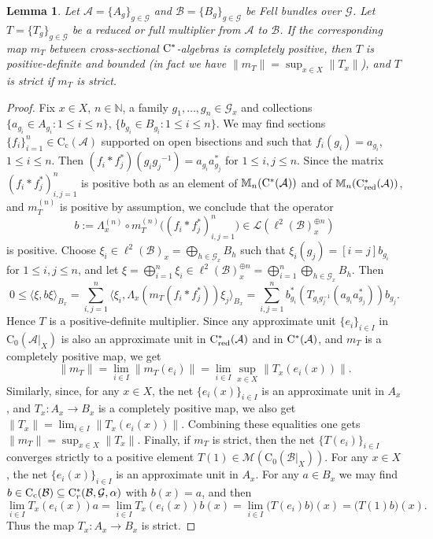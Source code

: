\documentclass[11 pt, leqno]{amsart}
\numberwithin{equation}{section}
\theoremstyle{plain}
\newtheorem {lem} [thm]{Lemma}
\theoremstyle{definition}
\newcommand{\Mat}{\mathbb M} %
\newcommand*{\contc}{\mathrm{C_c}}%
\newcommand*{\contz}{\mathrm{C_0}}%
\renewcommand{\star}{*}
\DeclareMathOperator{\red}{red}%
\newcommand{\B}{\mathcal B}
\newcommand{\M}{\mathcal M}
\newcommand{\m}{m}
\newcommand{\G}{\mathcal G} %
\renewcommand{\L}{\mathcal L}
\newcommand{\A}{\mathcal A}
\newcommand{\N}{\mathbb N}
\newcommand{\cst}{\ifmmode\mathrm{C}^*\else{$\mathrm{C}^*$}\fi}
\begin{document}
\begin{lem}\label{lem:completely_positive_implies_positive_definite}
Let $\A = \{ A_g \}_{g \in \G}$ and $\B = \{ B_g \}_{g \in \G}$ be Fell bundles over $\G$. 
Let $T = \{ T_g \}_{g\in \G}$ be a reduced or full multiplier from $\A$ to $\B$. 
If the corresponding map $\m_T$ between cross-sectional $\cst$-algebras is completely positive, then $T$ is positive-definite and bounded (in fact we have $\|\m_T\|=\sup_{x\in X}\|T_x\|$), and $T$ is strict if $\m_T$ is strict.
\end{lem}
\begin{proof}
Fix $x \in X$, $n \in \N$, a family $g_1 , \ldots , g_n \in \G_x$ and collections $\{ a_{g_i} \in A_{g_i} : 1 \leq i \leq n \}$, $\{ b_{g_i} \in B_{g_i} : 1 \leq i \leq n \}$. 
We may find sections $\{ f_i \}_{i = 1}^n \in \contc(\A)$ supported on open bisections and such that $f_{i}(g_i) = a_{g_i}$, $1 \leq i \leq n$. 
Then $(f_i * f_j^*)(g_i {g_j}^{-1}) = a_{g_i} a_{g_j}^{\star}$ for $1 \leq i,j \leq n$. 
Since the matrix $(f_i * f_j^*)_{i,j = 1}^n$ is positive both as an element of $\Mat_{n}(\cst(\A))$ and of $\Mat_{n}(\cst_{\red}(\A))$, and $\m_T^{(n)}$ is positive by assumption, we conclude that the operator 
\[ 
    b := \Lambda_x^{(n)} \circ \m_T^{(n)}  \big( (f_i * f_j^*)_{i , j = 1}^n \big) \in \L(\ell^2(\B)_{x}^{\oplus n})  
\]
is positive. 
Choose $\xi_i \in \ell^2(\B)_{x} = \bigoplus_{h \in \G_x} B_{h}$ such that $\xi_i(g_j) = [i = j] b_{g_i}$ for $1 \leq i,j \leq n$, and let $\xi = \bigoplus_{i = 1}^n \xi_{i} \in \ell^2(\B)_{x}^{\oplus n} =\bigoplus_{i = 1}^n \bigoplus_{h \in \G_x} B_{h}$. 
Then 
\[
    0 \leq \langle \xi, b \xi \rangle_{B_x} = \sum_{i , j = 1}^n \langle \xi_i , \Lambda_x(\m_T (f_i * f_j^*)) \xi_j \rangle_{B_x} = \sum_{i,j = 1}^n b_{g_i}^{\star} \left( T_{g_i g_j^{-1}} (a_{g_i} a_{g_j}^{\star}) \right) b_{g_j} .
\]
Hence $T$ is a positive-definite multiplier. 
Since any approximate unit $\{e_i\}_{i\in I}$ in $\contz(\A|_X)$ is also an approximate unit in $\cst_{\red}(\A)$ and in $\cst(\A)$, and $\m_T$ is a completely positive map, we get  
\[
    \| \m_T \| = \lim_{i\in I} \| \m_T(e_i) \| = \lim_{i\in I} \sup_{x\in X} \| T_x(e_i(x)) \| .
\]
Similarly, since, for any $x\in X$, the net $\{e_i(x)\}_{i \in I}$ is an approximate unit in $A_x$, and $T_x : A_x \to B_x$ is a completely positive  map, we also get $\| T_{x} \| = \lim_{i\in I} \| T_x (e_i(x)) \|$. 
Combining these equalities one gets $\|\m_T\|=\sup_{x\in X}\|T_x\|$.
Finally, if  $\m_T$ is strict, then the net $\{T(e_i)\}_{i \in I}$ converges strictly to a positive element $T(1)\in \M(\contz(\B|_X))$. 
For any $x\in X$, the net $\{e_i(x)\}_{i\in I}$ is an approximate unit in $A_x$.
For any $a\in B_x$ we may find $b \in \contc(\B)\subseteq \cst_r(\B,\G,\alpha)$ with $b(x) = a$, and then
\[
    \lim_{i\in I} T_x(e_i(x))a = \lim_{i\in I} T_x(e_i(x))b(x) = \lim_{i\in I} \big( T(e_i) b \big)(x) = \big( T(1)b \big)(x).
\]
Thus the map $T_x:A_x\to B_{x}$ is strict. 
\end{proof}
\end{document}
